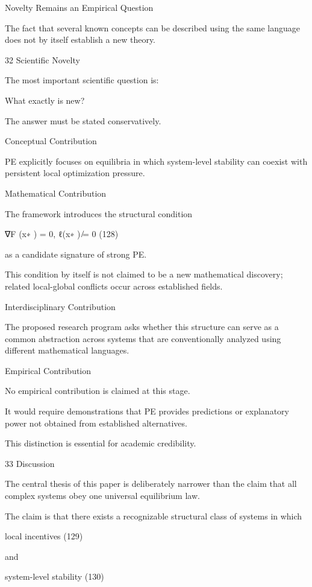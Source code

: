 \documentclass[10pt,a4paper]{article}
\begin{document}
\begin{ManuscriptText}
Novelty Remains an Empirical Question

The fact that several known concepts can be described using the same language does not by
itself establish a new theory.


32     Scientific Novelty

The most important scientific question is:


      What exactly is new?


The answer must be stated conservatively.


Conceptual Contribution

PE explicitly focuses on equilibria in which system-level stability can coexist with persistent
local optimization pressure.


Mathematical Contribution

The framework introduces the structural condition


                                    ∇F (x∗ ) = 0,     ℓ(x∗ ) ̸= 0                         (128)

as a candidate signature of strong PE.

This condition by itself is not claimed to be a new mathematical discovery; related local-global
conflicts occur across established fields.


Interdisciplinary Contribution

The proposed research program asks whether this structure can serve as a common abstraction
across systems that are conventionally analyzed using different mathematical languages.


Empirical Contribution

No empirical contribution is claimed at this stage.

It would require demonstrations that PE provides predictions or explanatory power not obtained
from established alternatives.

This distinction is essential for academic credibility.


33     Discussion

The central thesis of this paper is deliberately narrower than the claim that all complex systems
obey one universal equilibrium law.

The claim is that there exists a recognizable structural class of systems in which


                                            local incentives                               (129)

and


                                      system-level stability                               (130)


\end{ManuscriptText}
\end{document}
